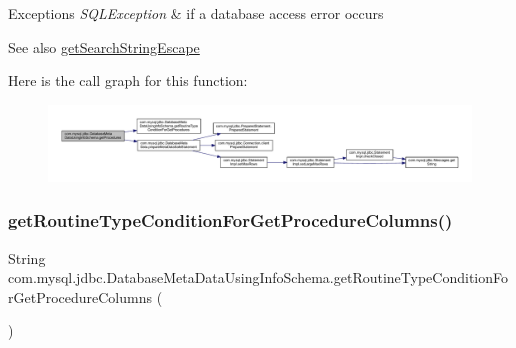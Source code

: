 \begin{DoxyExceptions}{Exceptions}
{\em S\+Q\+L\+Exception} & if a database access error occurs \\
\hline
\end{DoxyExceptions}
\begin{DoxySeeAlso}{See also}
\mbox{\hyperlink{classcom_1_1mysql_1_1jdbc_1_1_database_meta_data_a210b7942557a965c3af550074bb6fe9d}{get\+Search\+String\+Escape}} 
\end{DoxySeeAlso}
Here is the call graph for this function\+:
\nopagebreak
\begin{figure}[H]
\begin{center}
\leavevmode
\includegraphics[width=350pt]{classcom_1_1mysql_1_1jdbc_1_1_database_meta_data_using_info_schema_a1f2fd58fdf545dc23641793c4035f91d_cgraph}
\end{center}
\end{figure}
\mbox{\label{classcom_1_1mysql_1_1jdbc_1_1_database_meta_data_using_info_schema_a0ccd2f846e79fd6ef8d5f77c6200fb03}} 
\subsubsection{\texorpdfstring{get\+Routine\+Type\+Condition\+For\+Get\+Procedure\+Columns()}{getRoutineTypeConditionForGetProcedureColumns()}}
{\footnotesize\ttfamily String com.\+mysql.\+jdbc.\+Database\+Meta\+Data\+Using\+Info\+Schema.\+get\+Routine\+Type\+Condition\+For\+Get\+Procedure\+Columns (\begin{DoxyParamCaption}{ }\end{DoxyParamCaption})\hspace{0.3cm}{\ttfamily [protected]}}

